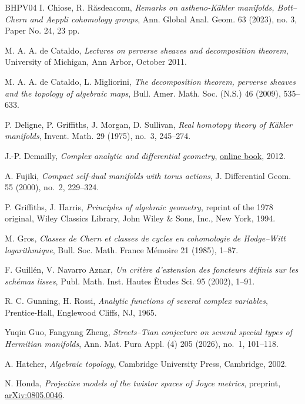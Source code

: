 \documentclass[11pt]{amsart}
\numberwithin{equation}{section}
\theoremstyle{plain}
\theoremstyle{definition}
\begin{document}
\begin{thebibliography}{BHPV04}
I. Chiose, R. R\u{a}sdeaconu,
\textit{Remarks on astheno-K\"ahler manifolds, Bott--Chern and Aeppli
cohomology groups},
Ann. Global Anal. Geom. 63 (2023), no. 3, Paper No. 24, 23 pp.

M. A. A. de Cataldo,
\textit{Lectures on perverse sheaves and decomposition theorem},
University of Michigan, Ann Arbor, October 2011.

M. A. A. de Cataldo, L. Migliorini,
\textit{The decomposition theorem, perverse sheaves and the topology of
algebraic maps},
Bull. Amer. Math. Soc. (N.S.) 46 (2009), 535--633.

P. Deligne, P. Griffiths, J. Morgan, D. Sullivan,
\textit{Real homotopy theory of K\"ahler manifolds},
Invent. Math. 29 (1975), no.~3, 245--274.

J.-P. Demailly,
\textit{Complex analytic and differential geometry},
\href{https://www-fourier.ujf-grenoble.fr/~demailly/manuscripts/agbook.pdf}
{online book}, 2012.

A. Fujiki,
\textit{Compact self-dual manifolds with torus actions},
J. Differential Geom. 55 (2000), no.~2, 229--324.

P. Griffiths, J. Harris,
\textit{Principles of algebraic geometry}, reprint of the 1978 original,
Wiley Classics Library, John Wiley \& Sons, Inc., New York, 1994.

M. Gros,
\textit{Classes de Chern et classes de cycles en cohomologie de Hodge--Witt
logarithmique},
Bull. Soc. Math. France M\'emoire 21 (1985), 1--87.

F. Guill\'en, V. Navarro Aznar,
\textit{Un crit\`ere d'extension des foncteurs d\'efinis sur les sch\'emas
lisses},
Publ. Math. Inst. Hautes \`Etudes Sci. 95 (2002), 1--91.

R. C. Gunning, H. Rossi,
\textit{Analytic functions of several complex variables},
Prentice-Hall, Englewood Cliffs, NJ, 1965.

Yuqin Guo, Fangyang Zheng,
\textit{Streets--Tian conjecture on several special types of Hermitian
manifolds},
Ann. Mat. Pura Appl. (4) 205 (2026), no.~1, 101--118.

A. Hatcher,
\textit{Algebraic topology},
Cambridge University Press, Cambridge, 2002.

N. Honda,
\textit{Projective models of the twistor spaces of Joyce metrics},
preprint, \href{https://arxiv.org/abs/0805.0046}{arXiv:0805.0046}.


\end{thebibliography}
\end{document}
